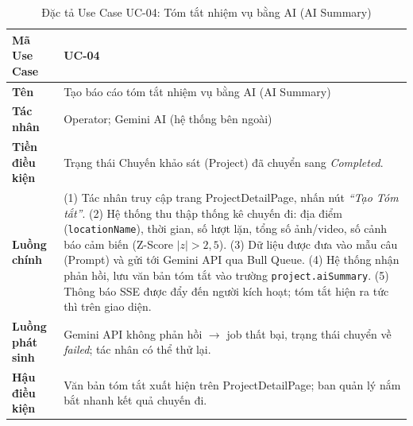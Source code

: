 \documentclass[../DoAn.tex]{subfiles}
\begin{document}
\begin{longtable}{|p{3.5cm}|p{10.0cm}|}
\caption{Đặc tả Use Case UC-04: Tóm tắt nhiệm vụ bằng AI (AI Summary)}\label{tab:b-uc04}\\
\hline
\textbf{Mã Use Case} & UC-04 \\
\hline
\textbf{Tên} & Tạo báo cáo tóm tắt nhiệm vụ bằng AI (AI Summary) \\
\hline
\textbf{Tác nhân} & Operator; Gemini AI (hệ thống bên ngoài) \\
\hline
\textbf{Tiền điều kiện} & Trạng thái Chuyến khảo sát (Project) đã chuyển sang \textit{Completed}. \\
\hline
\textbf{Luồng chính} &
(1) Tác nhân truy cập trang ProjectDetailPage, nhấn nút \textit{``Tạo Tóm tắt''}. \newline
(2) Hệ thống thu thập thống kê chuyến đi: địa điểm (\texttt{locationName}), thời gian, số lượt lặn, tổng số ảnh/video, số cảnh báo cảm biến (Z-Score $|z| > 2{,}5$). \newline
(3) Dữ liệu được đưa vào mẫu câu (Prompt) và gửi tới Gemini API qua Bull Queue. \newline
(4) Hệ thống nhận phản hồi, lưu văn bản tóm tắt vào trường \texttt{project.aiSummary}. \newline
(5) Thông báo SSE được đẩy đến người kích hoạt; tóm tắt hiện ra tức thì trên giao diện. \\
\hline
\textbf{Luồng phát sinh} & Gemini API không phản hồi $\to$ job thất bại, trạng thái chuyển về \textit{failed}; tác nhân có thể thử lại. \\
\hline
\textbf{Hậu điều kiện} & Văn bản tóm tắt xuất hiện trên ProjectDetailPage; ban quản lý nắm bắt nhanh kết quả chuyến đi. \\
\hline
\end{longtable}
\end{document}
